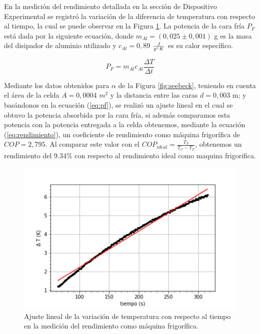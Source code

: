 \documentclass[twoside,twocolumn,a4paper]{article}
\begin{document}
En la medici\'on del rendimiento detallada en la secci\'on de Dispositivo Experimental se registr\'o la variaci\'on de la diferencia de temperatura con respecto al tiempo, la cual se puede observar en la Figura \ref{fig:joule}. La potencia de la cara fr\'ia $P_{F}$ est\'a dada por la siguiente ecuaci\'on, donde $m_{Al} = (0,025 \pm 0,001)$ g es la masa del disipador de aluminio utilizado y $c_{Al} = 0,89$ $\frac{J}{g \degree K}$ es su calor espec\'ifico.


\begin{equation}
\label{eq:pf}
P_{F} = m_{Al} c_{Al} \frac{\Delta T}{\Delta t}
\end{equation}


Mediante los datos obtenidos para $\alpha$ de la Figura \ref{fig:seebeck}, teniendo en cuenta el \'area de la celda $A = 0,0004 $ $m^{2}$ y la distancia entre las caras $d = 0,003$ m; y bas\'andonos en la ecuaci\'on (\ref{eq:pf}), se realiz\'o un ajuste lineal en el cual se obtuvo la potencia absorbida por la cara fr\'ia, si adem\'as comparamos esta potencia con la potencia entregada a la celda obtenemos, mediante la ecuaci\'on (\ref{eq:rendimiento}), un coeficiente de rendimiento como m\'aquina frigor\'ifica de  $COP = 2,795$. Al comparar este valor con el $COP_{ideal} = \frac{T_{F}}{T_{C}-T_{F}}$, obtenemos un rendimiento del $9.34 \%$ con respecto al rendimiento ideal como maquina frigorifica. 


\begin{figure}[H]
\includegraphics[width=\linewidth]{joule_ajuste.png}
\caption{Ajuste lineal de la variaci\'on de temperatura con respecto al tiempo en la medici\'on del rendimiento como m\'aquina frigor\'ifica.}
\label{fig:joule}
\end{figure}
\end{document}
